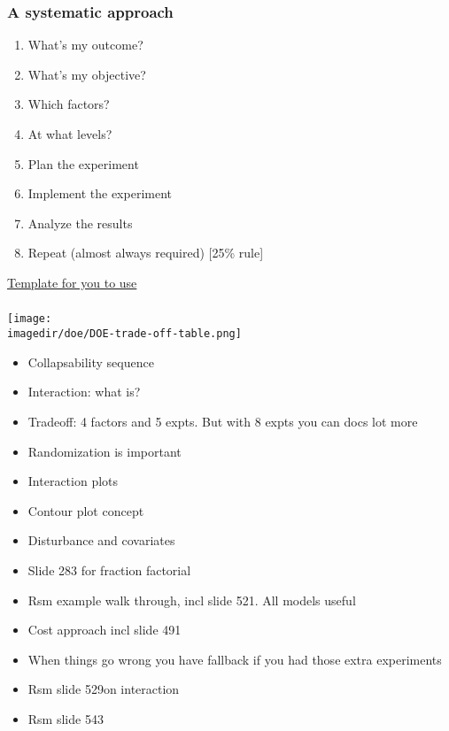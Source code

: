 \documentclass[handout,11pt,aspectratio=169,mathserif]{beamer}
\begin{document}
\begin{frame}\frametitle{A systematic approach } 
	\Large
	 \begin{enumerate}
	 	\item	What's my outcome? \pause
	 	\item	What's my objective? \pause
	 	\item	Which factors? \pause
		\item	At what levels?\pause
	 	\item	Plan the experiment \pause
	 	\item	Implement the experiment\pause
	 	\item	Analyze the results\pause
		\item	Repeat (almost always required) [25\% rule]
	 \end{enumerate}
	 
 	 \vspace{12pt}
	 \small
	 {\color{purple}  \href{http://yint.org/template}{Template for you to use}}
\end{frame}


\begin{frame}\frametitle{}
	\centerline{\texttt{[image: \\imagedir/doe/DOE-trade-off-table.png]}}
\end{frame}


\begin{itemize}
	
	\item   Collapsability sequence
	\item 	Interaction: what is?
	\item 	Tradeoff: 4 factors and 5 expts. But with 8 expts you can docs lot more
	\item 	Randomization is important
	\item 	Interaction plots
	\item 	Contour plot concept
	\item 	Disturbance and covariates
	\item 	Slide 283 for fraction factorial
	\item 	Rsm example walk through, incl slide 521. All models useful
	\item 	Cost approach incl slide 491
	\item 	When things go wrong you have fallback if you had those extra experiments
	
	\item	Rsm slide 529on interaction
	\item 	Rsm slide 543
	
	


\end{itemize}
\end{document}
